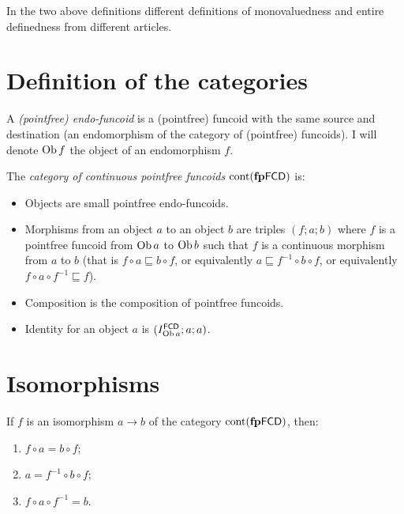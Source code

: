 \begin{rem}
  In the two above definitions different definitions of monovaluedness and
  entire definedness from different articles.
\end{rem}

\section{Definition of the categories}

\begin{defn}
  A \emph{(pointfree) endo-funcoid} is a (pointfree) funcoid with the same
  source and destination (an endomorphism of the category of (pointfree)
  funcoids). I will denote $\operatorname{Ob} f$ the object of an endomorphism $f$.
\end{defn}

\begin{obvious}
The \emph{category of continuous pointfree funcoids} $\operatorname{cont}
(\mathbf{fp} \mathsf{FCD})$ is:
\begin{itemize}
  \item Objects are small pointfree endo-funcoids.
  
  \item Morphisms from an object $a$ to an object $b$ are triples $(f ; a ;
  b)$ where $f$ is a pointfree funcoid from $\operatorname{Ob} a$ to $\operatorname{Ob} b$
  such that $f$ is a continuous morphism from $a$ to $b$ (that is $f \circ a
  \sqsubseteq b \circ f$, or equivalently $a \sqsubseteq f^{- 1} \circ b \circ
  f$, or equivalently $f \circ a \circ f^{- 1} \sqsubseteq f$).
  
  \item Composition is the composition of pointfree funcoids.
  
  \item Identity for an object $a$ is $(I^{\mathsf{FCD}}_{\operatorname{Ob} a}
  ; a ; a)$.
\end{itemize}
\end{obvious}

\section{Isomorphisms}

\begin{thm}
  If $f$ is an isomorphism $a \rightarrow b$ of the category
  $\operatorname{cont} (\mathbf{fp}
  \mathsf{FCD})$, then:
  \begin{enumerate}
    \item $f \circ a = b \circ f$;
    
    \item $a = f^{- 1} \circ b \circ f$;
    
    \item $f \circ a \circ f^{- 1} = b$.
  \end{enumerate}
\end{thm}

